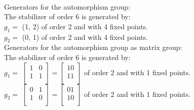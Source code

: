 \\
Generators for the automorphism group: \\
The stabilizer of order $6$ is generated by:\\
$g_{1} = $ (1, 2) of order 2 and with 4 fixed points.\\
$g_{2} = $ (0, 1) of order 2 and with 4 fixed points.\\

\bigskip
Generators for the automorphism group as matrix group: \\
The stabilizer of order $6$ is generated by:\\
$g_{1} = $ $\left[
\begin{array}{*{2}{r}}
1 & 0\\
1 & 1\\
\end{array}
\right]
=
\left[
\begin{array}{c}
10\\
11\\
\end{array}
\right]
$ of order 2 and with 1 fixed points.\\
$g_{2} = $ $\left[
\begin{array}{*{2}{r}}
0 & 1\\
1 & 0\\
\end{array}
\right]
=
\left[
\begin{array}{c}
01\\
10\\
\end{array}
\right]
$ of order 2 and with 1 fixed points.\\


